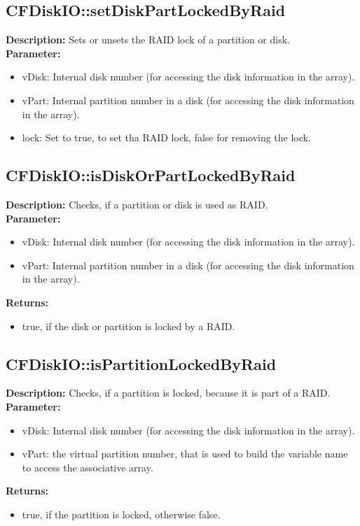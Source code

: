 \subsection{CFDiskIO::setDiskPartLockedByRaid}
\textbf{Description:} Sets or unsets the RAID lock of a partition or disk.\\
\textbf{Parameter:}
\begin{itemize}
\item vDisk: Internal disk number (for accessing the disk information in the array).
\item vPart: Internal partition number in a disk (for accessing the disk information in the array).
\item lock: Set to true, to set tha RAID lock, false for removing the lock.
\end{itemize}

\subsection{CFDiskIO::isDiskOrPartLockedByRaid}
\textbf{Description:} Checks, if a partition or disk is used as RAID.\\
\textbf{Parameter:}
\begin{itemize}
\item vDisk: Internal disk number (for accessing the disk information in the array).
\item vPart: Internal partition number in a disk (for accessing the disk information in the array).
\end{itemize}
\textbf{Returns:}
\begin{itemize}
\item true, if the disk or partition is locked by a RAID.
\end{itemize}

\subsection{CFDiskIO::isPartitionLockedByRaid}
\textbf{Description:} Checks, if a partition is locked, because it is part of a RAID.\\
\textbf{Parameter:}
\begin{itemize}
\item vDisk: Internal disk number (for accessing the disk information in the array).
\item vPart: the virtual partition number, that is used to build the variable name to access the associative array.
\end{itemize}
\textbf{Returns:}
\begin{itemize}
\item true, if the partition is locked, otherwise false.
\end{itemize}

